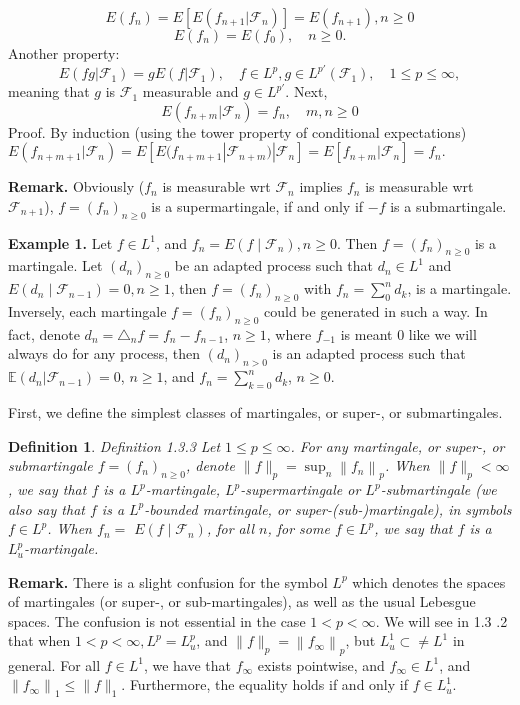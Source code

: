 \documentclass[reqno]{amsart}
\newtheorem{definition}[thm]{Definition}
\numberwithin{equation}{section}
\begin{document}
$$E(f_n)=E[E(f_{n+1}|\mathcal{F}_n)]=E(f_{n+1}), n\ge 0$$
$$E(f_n)=E(f_0), \quad n\ge0.$$
Another property: 
$$E(fg|\mathcal{F}_1)=gE(f|\mathcal{F}_1), \quad f\in L^p, g\in L^{p'}(\mathcal{F}_1), \quad 1\le p\le \infty,$$
meaning that $g$ is $\mathcal{F}_1$ measurable and $g\in L^{p'}.$
Next,
$$E(f_{n+m}|\mathcal{F}_n)=f_n, \quad m,n \ge 0$$
Proof. By induction (using the tower property of conditional expectations) $E(f_{n+m+1}|\mathcal{F}_n)=E[E(f_{n+m+1}|\mathcal{F}_{n+m})|\mathcal{F}_n]=E[f_{n+m}|\mathcal{F}_n]=f_n.$

{\bf Remark.} Obviously ($f_n$ is measurable wrt $\mathcal{F}_n$ implies $f_n$ is measurable wrt $\mathcal{F}_{n+1}$), $f=\left(f_n\right)_{n \geq 0}$ is a supermartingale, if and only if $-f$ is a submartingale.

{\bf Example 1.} Let $f \in L^1$, and $f_n=E\left(f \mid \mathcal{F}_n\right), n \geq 0$. Then $f=\left(f_n\right)_{n \geq 0}$ is a martingale. Let $\left(d_n\right)_{n \geq 0}$ be an adapted process such that $d_n \in L^1$ and $E\left(d_n \mid \mathcal{F}_{n-1}\right)=0, n \geq 1$, then $f=\left(f_n\right)_{n \geq 0}$ with $f_n=\sum_0^n d_k$, is a martingale. Inversely, each martingale 
$f = (f_n)_{n \geq 0}$ could be generated in such a way. In fact, denote $d_n = \triangle_{n} f = f_n - f_{n-1}$, $n \geq 1$, where $f_{-1}$ is meant $0$ like we will always do for any process, then $(d_n)_{n > 0}$ is an adapted process such that $\mathbb{E}(d_n | \mathcal{F}_{n-1}) = 0$, $n \geq 1$, and $f_n = \sum_{k=0}^{n} d_k$, $n \geq 0$.

\bigskip

First, we define the simplest classes of martingales, or super-, or submartingales.

\begin{definition}
Definition 1.3.3 Let $1 \leq p \leq \infty$. For any martingale, or super-, or submartingale $f=\left(f_n\right)_{n \geq 0}$, denote $\|f\|_p=\sup _n\left\|f_n\right\|_p$. When $\|f\|_p<\infty$, we say that $f$ is a $L^p$-martingale, $L^p$-supermartingale or $L^p$-submartingale (we also say that $f$ is a $L^p$-bounded martingale, or super-(sub-)martingale), in symbols $f \in L^p$. When $f_n=$ $E\left(f \mid \mathcal{F}_n\right)$, for all $n$, for some $f \in L^p$, we say that $f$ is a $L_u^p$-martingale.
\end{definition}

{\bf Remark.} There is a slight confusion for the symbol $L^p$ which denotes the spaces of martingales (or super-, or sub-martingales), as well as the usual Lebesgue spaces. The confusion is not essential in the case $1<p<\infty$. We will see in 1.3 .2 that when $1<p<\infty, L^p=L_u^p$, and $\|f\|_p=\left\|f_{\infty}\right\|_p$, but 
$L_u^1 \subset\neq L^1$ in general. 
For all $f \in L^1$, we have that $f_{\infty}$ exists pointwise, and $f_{\infty} \in L^1$, and $\left\|f_{\infty}\right\|_1 \leq\|f\|_1$. Furthermore, the equality holds if and only if $f \in L_u^1$.
\end{document}
